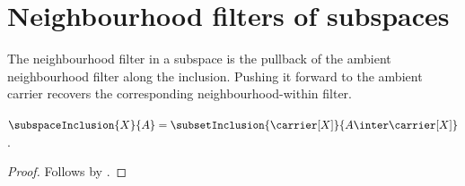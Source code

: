 \section{Neighbourhood filters of subspaces}




The neighbourhood filter in a subspace is the pullback of the ambient
neighbourhood filter along the inclusion.  Pushing it forward to the ambient
carrier recovers the corresponding neighbourhood-within filter.

\begin{proposition}\label{subspace_inclusion_is_subset_inclusion}
    $\subspaceInclusion{X}{A}
        =\subsetInclusion{\carrier[X]}{A\inter\carrier[X]}$.
\end{proposition}
\begin{proof}
    Follows by .
\end{proof}

